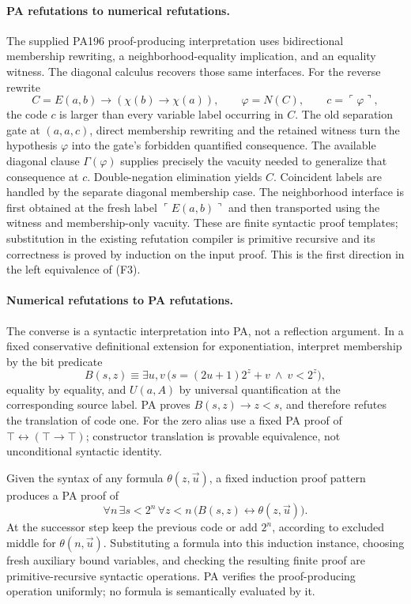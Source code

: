\paragraph{PA refutations to numerical refutations.}
The supplied PA196 proof-producing interpretation uses bidirectional
membership rewriting, a neighborhood-equality implication, and an equality
witness. The diagonal calculus recovers those same interfaces. For the
reverse rewrite
\[
 C=E(a,b)\to(\chi(b)\to\chi(a)),
 \qquad \varphi=N(C),\qquad c=\ulcorner\varphi\urcorner,
\]
the code $c$ is larger than every variable label occurring in $C$. The
old separation gate at $(a,a,c)$, direct membership rewriting and the
retained witness turn the hypothesis $\varphi$ into the gate's forbidden
quantified consequence. The available diagonal clause
$\Gamma(\varphi)$ supplies precisely the vacuity needed to generalize
that consequence at $c$. Double-negation elimination yields $C$.
Coincident labels are handled by the separate diagonal membership case.
The neighborhood interface is first obtained at the fresh label
$\ulcorner E(a,b)\urcorner$ and then transported using the witness and
membership-only vacuity. These are finite syntactic proof templates;
substitution in the existing refutation compiler is primitive recursive
and its correctness is proved by induction on the input proof. This is
the first direction in the left equivalence of (F3).

\paragraph{Numerical refutations to PA refutations.}
The converse is a syntactic interpretation into PA, not a reflection
argument. In a fixed conservative definitional extension for
exponentiation, interpret membership by the bit predicate
\[
 B(s,z)\equiv\exists u,v\,
       \bigl(s=(2u+1)2^z+v\ \wedge\ v<2^z\bigr),
\]
equality by equality, and $U(a,A)$ by universal quantification at the
corresponding source label. PA proves $B(s,z)\to z<s$, and therefore
refutes the translation of code one. For the zero alias use a fixed PA
proof of $\top\leftrightarrow(\top\to\top)$; constructor translation is
provable equivalence, not unconditional syntactic identity.

Given the syntax of any formula $\theta(z,\vec u)$, a fixed induction
proof pattern produces a PA proof of
\[
 \forall n\,\exists s<2^n\,\forall z<n\,
              \bigl(B(s,z)\leftrightarrow\theta(z,\vec u)\bigr).
\]
At the successor step keep the previous code or add $2^n$, according to
excluded middle for $\theta(n,\vec u)$. Substituting a formula into this
induction instance, choosing fresh auxiliary bound variables, and checking
the resulting finite proof are primitive-recursive syntactic operations.
PA verifies the proof-producing operation uniformly; no formula is
semantically evaluated by it.

